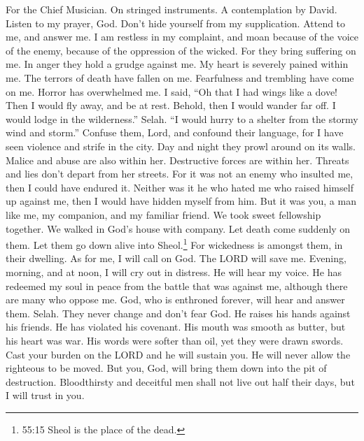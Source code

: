 For the Chief Musician. On stringed instruments. A contemplation by
David.  Listen to my prayer, God. Don't hide yourself from
my supplication.  Attend to me, and answer me. I am restless
in my complaint, and moan  because of the voice of the
enemy, because of the oppression of the wicked. For they bring suffering
on me. In anger they hold a grudge against me.  My heart is
severely pained within me. The terrors of death have fallen on me.
 Fearfulness and trembling have come on me. Horror has
overwhelmed me.  I said, ``Oh that I had wings like a dove!
Then I would fly away, and be at rest.  Behold, then I would
wander far off. I would lodge in the wilderness.'' Selah. 
``I would hurry to a shelter from the stormy wind and storm.''
 Confuse them, Lord, and confound their language, for I have
seen violence and strife in the city.  Day and night they
prowl around on its walls. Malice and abuse are also within her.
 Destructive forces are within her. Threats and lies don't
depart from her streets.  For it was not an enemy who
insulted me, then I could have endured it. Neither was it he who hated
me who raised himself up against me, then I would have hidden myself
from him.  But it was you, a man like me, my companion, and
my familiar friend.  We took sweet fellowship together. We
walked in God's house with company.  Let death come
suddenly on them. Let them go down alive into Sheol.\footnote{55:15
  Sheol is the place of the dead.} For wickedness is amongst them, in
their dwelling.  As for me, I will call on God. The LORD
will save me.  Evening, morning, and at noon, I will cry
out in distress. He will hear my voice.  He has redeemed my
soul in peace from the battle that was against me, although there are
many who oppose me.  God, who is enthroned forever, will
hear and answer them. Selah. They never change and don't fear God.
 He raises his hands against his friends. He has violated
his covenant.  His mouth was smooth as butter, but his
heart was war. His words were softer than oil, yet they were drawn
swords.  Cast your burden on the LORD and he will sustain
you. He will never allow the righteous to be moved.  But
you, God, will bring them down into the pit of destruction. Bloodthirsty
and deceitful men shall not live out half their days, but I will trust
in you.

